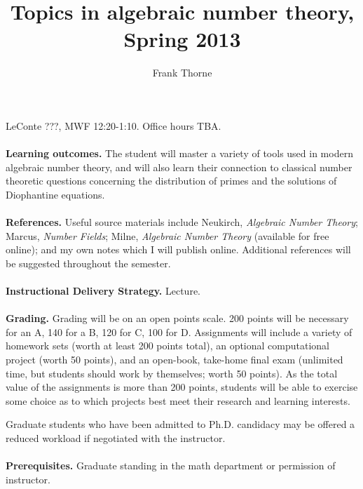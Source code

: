 \documentclass[11pt]{amsart}
\theoremstyle{remark}
\numberwithin{theorem}{section} \numberwithin{equation}{section}
\begin{document}
\title[Topics in algebraic number theory]
{Topics in algebraic number theory, Spring 2013}
\author{Frank Thorne}
\address{Department of Mathematics, University of South Carolina,
1523 Greene Street, Columbia, SC 29208}

\maketitle
LeConte ???, MWF 12:20-1:10. Office hours TBA.
\\
\\
{\bf Learning outcomes.} The student will master a variety of tools used in modern algebraic number theory, and will also
learn their connection to classical number theoretic questions concerning the distribution of primes and the solutions of
Diophantine equations.
\\
\\
{\bf References.} Useful source materials include Neukirch, {\itshape Algebraic Number Theory}; Marcus, {\itshape Number Fields};
Milne, {\itshape Algebraic Number Theory} (available for free online); and my own notes which I will publish online. Additional
references will be suggested throughout the semester.
\\
\\
{\bf Instructional Delivery Strategy.} Lecture.
\\
\\
{\bf Grading.} Grading will be on an open points scale. 200 points will be necessary for an A, 140 for a B, 120 for C, 100 for D.
Assignments will include a variety of homework sets (worth at least 200 points total), 
an optional computational project (worth 50 points), and an open-book, take-home final exam (unlimited time, but students should work
by themselves; worth 50 points). As the total value of the assignments is more than 200 points, 
students will be able to exercise some choice as to which projects
best meet their research and learning interests.
 
Graduate students who have been admitted to Ph.D. candidacy may be offered a reduced workload if negotiated with the instructor.
\\
\\
{\bf Prerequisites.} Graduate standing in the math department or permission of instructor. 
\end{document}
